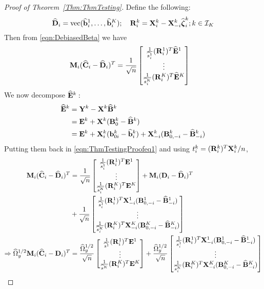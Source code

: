 \begin{proof}[Proof of Theorem~\ref{Thm:ThmTesting}]
Define the following:
%
$$
\widehat {{\mathbf{D}}}_i = \operatorname*{vec}(\widehat {{\bf{b}}}^1_i, \ldots, \widehat {{\bf{b}}}^K_i); \quad
{\mathbf{R}}_i^k = {\mathbf{X}}_i^k - {\mathbf{X}}_{-i}^k \widehat {{\boldsymbol{\zeta}}}_i^k; k \in {\cal{I}}_K
$$
%
Then from \eqref{eqn:DebiasedBeta} we have
%
\begin{align}\label{eqn:ThmTestingProofeq1}
{\mathbf{M}}_i ( \widehat {{\mathbf{C}}}_i - \widehat {{\mathbf{D}}}_i )^T &= \frac{1}{\sqrt n}
\begin{bmatrix}
\frac{1}{\widehat s^1_i} ({\mathbf{R}}^1_i)^T \widehat {{\mathbf{E}}}^1 \\
\vdots\\
\frac{1}{\widehat s^K_i} ({\mathbf{R}}^K_i)^T \widehat {{\mathbf{E}}}^K
\end{bmatrix}
\end{align}
%
We now decompose $\widehat {{\mathbf{E}}}^k:$
%
\begin{align*}
\widehat {{\mathbf{E}}}^k &= {\mathbf{Y}}^k - {\mathbf{X}}^k \widehat {{\mathbf{B}}}^k \\
&= {\mathbf{E}}^k + {\mathbf{X}}^k ({\mathbf{B}}_0^k - \widehat {{\mathbf{B}}}^k)\\
&= {\mathbf{E}}^k + {\mathbf{X}}_i^k ({\bf{b}}_{0i}^k - \widehat {{\bf{b}}}_i^k) + {\mathbf{X}}_{-i}^k ({\mathbf{B}}_{0,-i}^k - \widehat {{\mathbf{B}}}_{-i}^k)
\end{align*}
%
Putting them back in \eqref{eqn:ThmTestingProofeq1} and using $t_i^k = ({\mathbf{R}}_i^k)^T {\mathbf{X}}_i^k/n$,
%
\begin{align}
{\mathbf{M}}_i ( \widehat {{\mathbf{C}}}_i - \widehat {{\mathbf{D}}}_i)^T &= \frac{1}{\sqrt n}
\begin{bmatrix}
\frac{1}{\widehat s^1_i} ({\mathbf{R}}^1_i)^T {\mathbf{E}}^1 \\
\vdots\\
\frac{1}{\widehat s^K_i} ({\mathbf{R}}^K_i)^T {\mathbf{E}}^K
\end{bmatrix} +
{\mathbf{M}}_i ({\mathbf{D}}_i - \widehat {{\mathbf{D}}}_i )^T \notag\\
& + \frac{1}{\sqrt n}
\begin{bmatrix}
\frac{1}{\widehat s^1_i} ({\mathbf{R}}^1_i)^T {\mathbf{X}}_{-i}^1 ({\mathbf{B}}_{0,-i}^1 - \widehat {{\mathbf{B}}}_{-i}^1) \\
\vdots\\
\frac{1}{\widehat s^K_i} ({\mathbf{R}}^K_i)^T {\mathbf{X}}_{-i}^K ({\mathbf{B}}_{0,-i}^K - \widehat {{\mathbf{B}}}_{-i}^K)
\end{bmatrix} \notag\\
\Rightarrow
\widehat \Omega_y^{1/2} {\mathbf{M}}_i ( \widehat {{\mathbf{C}}}_i - {\mathbf{D}}_i)^T &=
\frac{\widehat \Omega_y^{1/2}}{\sqrt n}
\begin{bmatrix}
\frac{1}{\widehat s^1} ({\mathbf{R}}^1_i)^T {\mathbf{E}}^1 \\
\vdots\\
\frac{1}{\widehat s^K} ({\mathbf{R}}^K_i)^T {\mathbf{E}}^K
\end{bmatrix} +
\frac{\widehat \Omega_y^{1/2}}{\sqrt n}
\begin{bmatrix}
\frac{1}{\widehat s^1_i} ({\mathbf{R}}^1_i)^T {\mathbf{X}}_{-i}^1 ({\mathbf{B}}_{0,-i}^1 - \widehat {{\mathbf{B}}}_{-i}^1) \\
\vdots\\
\frac{1}{\widehat s^K_i} ({\mathbf{R}}^K_i)^T {\mathbf{X}}_{-i}^K ({\mathbf{B}}_{0,-i}^K - \widehat {{\mathbf{B}}}_{-i}^K)
\end{bmatrix}\label{eqn:ThmTestingProofeq2}
\end{align}


\end{proof}
